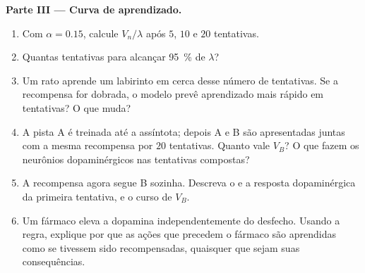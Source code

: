 \begin{problem}
\medskip
\noindent\textbf{Parte III --- Curva de aprendizado.}
\begin{enumerate}[resume]
  \item Com $\alpha = 0.15$, calcule $V_{n}/\lambda$ após $5$, $10$ e
        $20$ tentativas.
  \item Quantas tentativas para alcançar \qty{95}{\%} de $\lambda$?
  \item Um rato aprende um labirinto em cerca desse número de
        tentativas. Se a recompensa for dobrada, o modelo prevê
        aprendizado mais rápido em tentativas? O que muda?
  \item A pista A é treinada até a assíntota; depois A e B são
        apresentadas juntas com a mesma recompensa por $20$ tentativas.
        Quanto vale $V_{B}$? O que fazem os neurônios dopaminérgicos nas
        tentativas compostas?
  \item A recompensa agora segue B sozinha. Descreva o 
        e a resposta dopaminérgica da primeira tentativa, e o curso de
        $V_{B}$.
  \item Um fármaco eleva a dopamina independentemente do desfecho. Usando
        a regra, explique por que as ações que precedem o fármaco são
        aprendidas como se tivessem sido recompensadas, quaisquer que
        sejam suas consequências.
\end{enumerate}


\end{problem}
